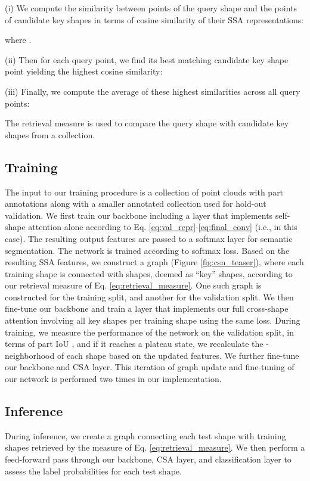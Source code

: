 \documentclass{egpubl}
\begin{document}
(i) We compute the similarity between points of the query shape and the points of candidate key shapes in terms of cosine similarity of their SSA representations:

\noindent where . 

(ii) Then for each query point, we find its best matching candidate key shape point yielding the highest cosine similarity:

(iii) Finally, we compute the average of these highest similarities across all query points:

The retrieval measure  is used to compare the query shape  with candidate key shapes from a collection.

\vspace*{-3mm}
\subsection{Training}
\label{subsec:training}
The input to our training procedure is a collection of point clouds with part annotations along with a smaller annotated collection
used for hold-out validation. We first train our backbone including a layer that implements self-shape attention alone according to Eq. \ref{eq:val_repr}-\ref{eq:final_conv} (i.e.,  in this case). The resulting output features are passed to a softmax layer for semantic segmentation. The network is trained according to softmax loss.
Based on the resulting SSA features, we construct a graph  (Figure \ref{fig:csn_teaser}), where 
 each training shape is connected with   shapes, deemed as ``key'' shapes,
 according to our retrieval measure of Eq. \ref{eq:retrieval_measure}. One such graph is constructed for
the training split, and another for the  validation split. We then fine-tune our backbone and train
 a layer that implements our full cross-shape attention involving all  key shapes per training shape using the same loss.  During training, we measure the performance of the network on the validation split, in terms of part IoU \cite{Mo:2019}, and if it reaches a plateau state, we recalculate the -neighborhood of each shape based on the updated features. We further fine-tune our backbone and CSA layer. This iteration of graph update and fine-tuning of our network is performed two times in our implementation.

\vspace*{-4mm}
\subsection{Inference}
\label{subsec:inference}
\label{subsec:test}
\label{subsec:testing}
During inference, we create a graph connecting each test shape with  training shapes retrieved by the measure of Eq. \ref{eq:retrieval_measure}. We then perform a feed-forward pass through our backbone, CSA layer, and classification layer to assess the label probabilities for each test shape.
\end{document}
